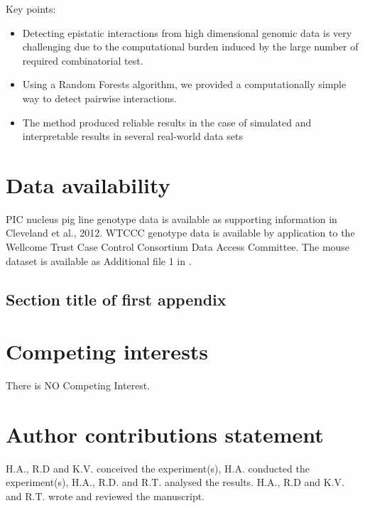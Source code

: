 \documentclass[unnumsec,webpdf,contemporary,large,namedate,figuresright,figuresleft]{oup-authoring-template}%
\theoremstyle{thmstyleone}%
\theoremstyle{thmstyletwo}%
\theoremstyle{thmstylethree}%
\begin{document}
Key points:
\begin{itemize}
\item Detecting epistatic interactions from high dimensional genomic data is very challenging due to the computational
  burden induced by the large number of required combinatorial test.
\item Using a Random Forests algorithm, we provided a computationally simple way to detect pairwise interactions.
\item The method produced reliable results in the case of simulated and interpretable results in several real-world
  data sets
\end{itemize}




\section{Data availability}
PIC nucleus pig line genotype data is available as supporting information in Cleveland et al., 2012. WTCCC genotype data
is available by application to the Wellcome Trust Case Control Consortium Data Access Committee. The mouse dataset is
available as Additional file 1 in \cite{martiniGenomicPredictionEpistasis2017}.



\begin{appendices}

\FloatBarrier
\section{Section title of first appendix}\label{sec11}




\end{appendices}



\section{Competing interests}
There is NO Competing Interest.

\section{Author contributions statement}
H.A., R.D and K.V. conceived the experiment(s), H.A. conducted
the experiment(s), H.A., R.D. and R.T. analysed the results.  H.A., R.D and K.V. and R.T.  wrote and reviewed the manuscript.
\end{document}
